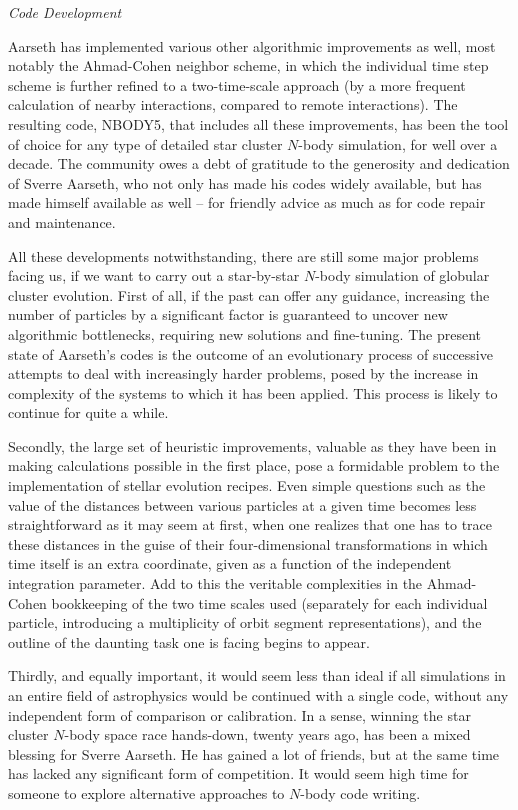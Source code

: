 \bigskip
\noindent
{\it Code Development}
\medskip

Aarseth has implemented various other algorithmic improvements as
well, most notably the Ahmad-Cohen neighbor scheme, in which the
individual time step scheme is further refined to a two-time-scale
approach (by a more frequent calculation of nearby interactions,
compared to remote interactions).  The resulting code, NBODY5, that
includes all these improvements, has been the tool of choice for any
type of detailed star cluster $N$-body simulation, for well over a
decade.  The community owes a debt of gratitude to the generosity and
dedication of Sverre Aarseth, who not only has made his codes widely
available, but has made himself available as well -- for friendly
advice as much as for code repair and maintenance.

All these developments notwithstanding, there are still some major
problems facing us, if we want to carry out a star-by-star $N$-body
simulation of globular cluster evolution.  First of all, if the past
can offer any guidance, increasing the number of particles by a
significant factor is guaranteed to uncover new algorithmic
bottlenecks, requiring new solutions and fine-tuning.  The present
state of Aarseth's codes is the outcome of an evolutionary process of
successive attempts to deal with increasingly harder problems, posed
by the increase in complexity of the systems to which it has been
applied.  This process is likely to continue for quite a while.

Secondly, the large set of heuristic improvements, valuable as they
have been in making calculations possible in the first place, pose a
formidable problem to the implementation of stellar evolution recipes.
Even simple questions such as the value of the distances between
various particles at a given time becomes less straightforward as it
may seem at first, when one realizes that one has to trace these
distances in the guise of their four-dimensional transformations in
which time itself is an extra coordinate, given as a function of the
independent integration parameter.  Add to this the veritable
complexities in the Ahmad-Cohen bookkeeping of the two time scales
used (separately for each individual particle, introducing a
multiplicity of orbit segment representations), and the outline
of the daunting task one is facing begins to appear.

Thirdly, and equally important, it would seem less than ideal if all
simulations in an entire field of astrophysics would be continued with
a single code, without any independent form of comparison or
calibration.  In a sense, winning the star cluster $N$-body space
race hands-down, twenty years ago, has been a mixed blessing for
Sverre Aarseth.  He has gained a lot of friends, but at the same time
has lacked any significant form of competition.  It would seem high
time for someone to explore alternative approaches to $N$-body code
writing.

